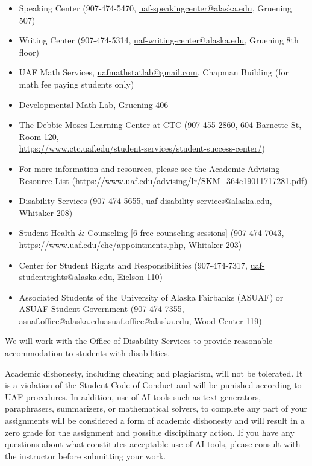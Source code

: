 \documentclass[12pt]{article}
\def\mailto#1{\href{mailto:#1}{#1}}
\begin{document}
\begin{itemize}
\setlength\itemsep{0em}
        \item Speaking Center (907-474-5470,
        \mailto{uaf-speakingcenter@alaska.edu}, Gruening 507)
\item Writing Center (907-474-5314, \mailto{uaf-writing-center@alaska.edu}, Gruening 8th floor)
\item UAF Math Services, \mailto{uafmathstatlab@gmail.com}, Chapman Building (for math fee paying students only)
\item Developmental Math Lab, Gruening 406
\item The Debbie Moses Learning Center at CTC (907-455-2860, 604 Barnette St, Room 120,\\ \mailto{https://www.ctc.uaf.edu/student-services/student-success-center/})
\item For more information and resources, please see the Academic Advising Resource List (\url{https://www.uaf.edu/advising/lr/SKM_364e19011717281.pdf})
\end{itemize}





\begin{itemize}
\setlength\itemsep{0em}
\item Disability Services (907-474-5655, \mailto{uaf-disability-services@alaska.edu}, Whitaker 208)
\item Student Health \& Counseling [6 free counseling sessions] (907-474-7043, \url{https://www.uaf.edu/chc/appointments.php}, Whitaker 203)
\item Center for Student Rights and Responsibilities (907-474-7317, \mailto{uaf-studentrights@alaska.edu}, Eielson 110)
\item Associated Students of the University of Alaska Fairbanks (ASUAF) or ASUAF Student Government (907-474-7355, \mailto{asuaf.office@alaska.edu}{asuaf.office@alaska.edu}, Wood Center 119)
\end{itemize}

 We will work with the Office of Disability Services to provide reasonable accommodation to students with disabilities.

Academic dishonesty, including cheating and plagiarism, will not be tolerated. It is a violation of the Student Code of Conduct and will be punished according to UAF procedures. In addition, use of AI tools such as text generators, paraphrasers, summarizers, or mathematical solvers, to complete any part of your assignments will be considered a form of academic dishonesty and will result in a zero grade for the assignment and possible disciplinary action. If you have any questions about what constitutes acceptable use of AI tools, please consult with the instructor before submitting your work.
\end{document}
